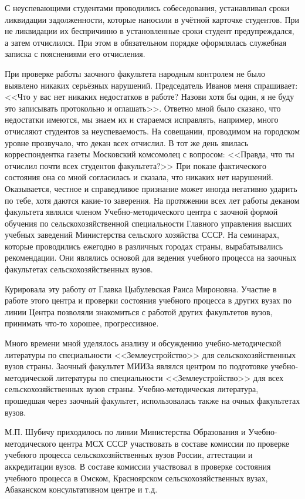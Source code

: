 С неуспевающими студентами проводились собеседования, устанавливал сроки ликвидации задолженности, которые наносили в учётной карточке студентов. При не ликвидации их беспричинно в установленные сроки студент предупреждался, а затем отчислился. При этом в обязательном порядке оформлялась служебная записка с пояснениями его отчисления.

При проверке работы заочного факультета народным контролем не было выявлено никаких серьёзных нарушений. Председатель Иванов меня спрашивает: <<Что у вас нет никаких недостатков в работе? Назови хотя бы один, я не буду это записывать протокольно и оглашать>>. Ответно мной было сказано, что недостатки имеются, мы знаем их и стараемся исправлять, например, много отчисляют студентов за неуспеваемость. На совещании, проводимом на городском уровне прозвучало, что декан всех отчислил. В тот же день явилась корреспондентка газеты Московский комсомолец с вопросом: <<Правда, что ты отчислил почти всех студентов факультета?>> При показе фактического состояния она со мной согласилась и сказала, что никаких нет нарушений. Оказывается, честное и справедливое признание может иногда негативно ударить по тебе, хотя даются какие-то заверения. На протяжении всех лет работы деканом факультета являлся членом Учебно-методического центра с заочной формой обучения по сельскохозяйственной специальности Главного управления высших учебных заведений Министерства сельского хозяйства СССР. На семинарах, которые проводились ежегодно в различных городах страны, вырабатывались рекомендации. Они являлись основой для ведения учебного процесса на заочных факультетах сельскохозяйственных вузов.

Курировала эту работу от Главка Цыбулевская Раиса Мироновна. Участие в работе этого центра и проверки состояния учебного процесса в других вузах по линии Центра позволяли знакомиться с работой других факультетов вузов, принимать что-то хорошее, прогрессивное.

Много времени мной уделялось анализу и обсуждению учебно-методической литературы по специальности <<Землеустройство>> для сельскохозяйственных вузов страны. Заочный факультет МИИЗа являлся центром по подготовке учебно-методической литературы по специальности <<Землеустройство>> для всех сельскохозяйственных вузов страны. Учебно-методическая литература, прошедшая через заочный факультет, использовалась также на очных факультетах вузов.

М.П. Шубичу приходилось по линии Министерства Образования и Учебно-методического центра МСХ СССР участвовать в составе комиссии по проверке учебного процесса сельскохозяйственных вузов России, аттестации и аккредитации вузов. В составе комиссии участвовал в проверке состояния учебного процесса в Омском, Красноярском сельскохозяйственных вузах, Абаканском консультативном центре и т.д.

